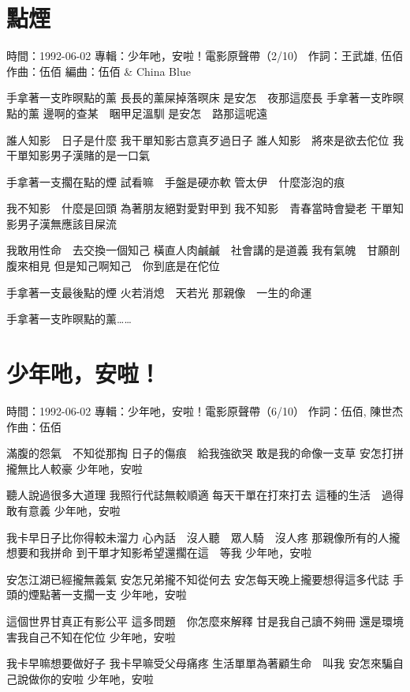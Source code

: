 \documentclass[UTF8,a4paper,oneside,twocolumn,12pt]{ctexbook}
\newcommand{\infopair}[2]{\textbullet #1：#2}
\newcommand{\zc}[1][伍佰]{\infopair{作詞}{#1}}
\newcommand{\zq}[1][伍佰]{\infopair{作曲}{#1}}
\newcommand{\bq}[1][伍佰]{\infopair{編曲}{#1}}
\newcommand{\zj}[1]{\infopair{專輯}{#1}}
\newcommand{\sj}[1]{\infopair{時間}{#1}}
\newenvironment{info}{\begin{flushleft}\kaishu
	}
	{\end{flushleft}\normalsize\yahei\par}
\newenvironment{lyric}{
	}
{}
\begin{document}
\section{點煙}
\begin{info}
	\sj{1992-06-02}
	\zj{少年吔，安啦！電影原聲帶（2/10）}
	\zc[王武雄, 伍佰]
	\zq
	\bq[伍佰 \& China Blue]
\end{info}
\begin{lyric}
	手拿著一支昨暝點的薰
	長長的薰屎掉落暝床
	是安怎　夜那這麼長
	手拿著一支昨暝點的薰
	邊啊的查某　睏甲足溫馴
	是安怎　路那這呢遠

	誰人知影　日子是什麼
	我干單知影古意真歹過日子
	誰人知影　將來是欲去佗位
	我干單知影男子漢賭的是一口氣

	手拿著一支擱在點的煙
	試看嘛　手盤是硬亦軟
	管太伊　什麼澎泡的痕

	我不知影　什麼是回頭
	為著朋友絕對愛對甲到
	我不知影　青春當時會變老
	干單知影男子漢無應該目屎流

	我敢用性命　去交換一個知己
	橫直人肉鹹鹹　社會講的是道義
	我有氣魄　甘願剖腹來相見
	但是知己啊知己　你到底是在佗位

	手拿著一支最後點的煙
	火若消熄　天若光
	那親像　一生的命運

	手拿著一支昨暝點的薰……
\end{lyric}

\section{少年吔，安啦！}
\begin{info}
	\sj{1992-06-02}
	\zj{少年吔，安啦！電影原聲帶（6/10）}
	\zc[伍佰, 陳世杰]
	\zq
\end{info}
\begin{lyric}
	滿腹的怨氣　不知從那掏
	日子的傷痕　給我強欲哭
	敢是我的命像一支草
	安怎打拼攏無比人較豪
	少年吔，安啦

	聽人說過很多大道理
	我照行代誌無較順適
	每天干單在打來打去
	這種的生活　過得敢有意義
	少年吔，安啦

	我卡早日子比你得較未溜力
	心內話　沒人聽　眾人騎　沒人疼
	那親像所有的人攏想要和我拼命
	到干單才知影希望還擱在這　等我
	少年吔，安啦

	安怎江湖已經攏無義氣
	安怎兄弟攏不知從何去
	安怎每天晚上攏要想得這多代誌
	手頭的煙點著一支擱一支
	少年吔，安啦

	這個世界甘真正有影公平
	這多問題　你怎麼來解釋
	甘是我自己讀不夠冊
	還是環境害我自己不知在佗位
	少年吔，安啦

	我卡早嘛想要做好子
	我卡早嘛受父母痛疼
	生活單單為著顧生命　叫我
	安怎來騙自己說做你的安啦
	少年吔，安啦
\end{lyric}
\end{document}
